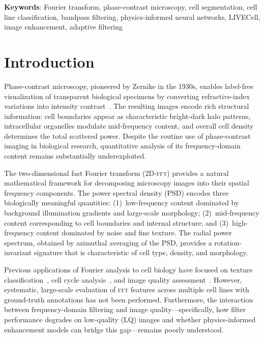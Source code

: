 \documentclass[11pt,a4paper]{article}
\newcommand{\fft}{\textsc{fft}\xspace}
\begin{document}
\textbf{Keywords}: Fourier transform, phase-contrast microscopy, cell
segmentation, cell line classification, bandpass filtering, physics-informed
neural networks, LIVECell, image enhancement, adaptive filtering

\section{Introduction}
\label{sec:intro}

Phase-contrast microscopy, pioneered by Zernike in the 1930s, enables
label-free visualization of transparent biological specimens by converting
refractive-index variations into intensity contrast~\cite{zernike1942}. The
resulting images encode rich structural information: cell boundaries appear
as characteristic bright-dark halo patterns, intracellular organelles
modulate mid-frequency content, and overall cell density determines the
total scattered power. Despite the routine use of phase-contrast imaging in
biological research, quantitative analysis of its frequency-domain content
remains substantially underexploited.

The two-dimensional fast Fourier transform (2D-\fft) provides a natural
mathematical framework for decomposing microscopy images into their spatial
frequency components. The power spectral density (PSD) encodes three
biologically meaningful quantities: (1)~low-frequency content dominated by
background illumination gradients and large-scale morphology;
(2)~mid-frequency content corresponding to cell boundaries and internal
structure; and (3)~high-frequency content dominated by noise and fine
texture. The radial power spectrum, obtained by azimuthal averaging of the
PSD, provides a rotation-invariant signature that is characteristic of
cell type, density, and morphology.

Previous applications of Fourier analysis to cell biology have focused on
texture classification~\cite{castleman1979}, cell cycle
analysis~\cite{lloyd1993}, and image quality
assessment~\cite{bray2012}. However, systematic, large-scale evaluation
of \fft features across multiple cell lines with ground-truth annotations
has not been performed. Furthermore, the interaction between frequency-domain
filtering and image quality---specifically, how filter performance degrades
on low-quality (LQ) images and whether physics-informed enhancement models
can bridge this gap---remains poorly understood.
\end{document}

